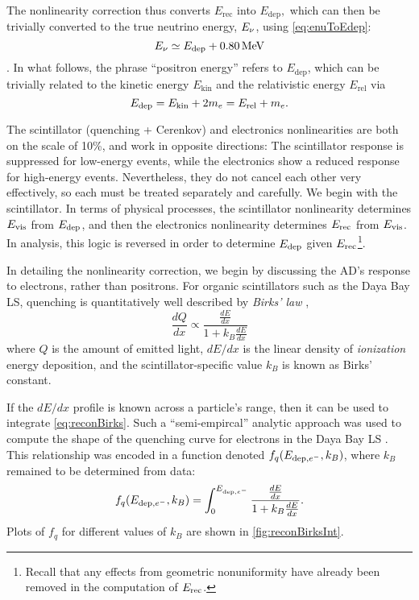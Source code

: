 \documentclass[../thesis.tex]{subfiles}
\begin{document}
The nonlinearity correction thus converts $E_{\mathrm{rec}}$ into $E_{\mathrm{dep}},$ which can then be trivially converted to the true neutrino energy, $E_\mathrm{\nu}$, using \autoref{eq:enuToEdep}:
\begin{equation}
  E_\mathrm{\nu} \simeq E_\mathrm{dep} + \SI{0.80}{MeV} 
\end{equation}.
In what follows, the phrase ``positron energy'' refers to $E_{\mathrm{dep}}$, which can be trivially related to the kinetic energy $E_{\mathrm{kin}}$ and the relativistic energy $E_{\mathrm{rel}}$ via
\begin{equation}
  E_\mathrm{dep} = E_{\mathrm{kin}} + 2m_e = E_{\mathrm{rel}} + m_e.
\end{equation}

The scintillator (quenching + Cerenkov)  and electronics nonlinearities are both on the scale of 10\%, and work in opposite directions: The scintillator response is suppressed for low-energy events, while the electronics show a reduced response for high-energy events. Nevertheless, they do not cancel each other very effectively, so each must be treated separately and carefully. We begin with the scintillator. In terms of physical processes, the scintillator nonlinearity determines $E_\mathrm{vis}$ from $E_\mathrm{dep}$, and then the electronics nonlinearity determines $E_\mathrm{rec}$ from $E_\mathrm{vis}$. In analysis, this logic is reversed in order to determine $E_\mathrm{dep}$ given $E_\mathrm{rec}$\footnote{Recall that any effects from geometric nonuniformity have already been removed in the computation of $E_\mathrm{rec}$.}.

In detailing the nonlinearity correction, we begin by discussing the AD's response to electrons, rather than positrons. For organic scintillators such as the Daya Bay LS, quenching is quantitatively well described by \emph{Birks' law} \cite{Birks_1951},
\begin{equation}
  \frac{dQ}{dx} \propto \frac{\frac{dE}{dx}}{1 + k_B \frac{dE}{dx}}
  \label{eq:reconBirks}
\end{equation}
where $Q$ is the amount of emitted light, $dE/dx$ is the linear density of \emph{ionization} energy deposition, and the scintillator-specific value $k_B$ is known as Birks' constant.

If the $dE/dx$ profile is known across a particle's range, then it can be used to integrate \eqref{eq:reconBirks}. Such a ``semi-empircal'' analytic approach was used to compute the shape of the quenching curve for electrons in the Daya Bay LS \cite{NonlinearityPaper}. This relationship was encoded in a function denoted $f_q(E_{\mathrm{dep},e^-}, k_B)$, where $k_B$ remained to be determined from data:
\begin{equation}
  f_q(E_{\mathrm{dep},e^-},k_B) = \int_0^{E_{\mathrm{dep},e^-}} \frac{\frac{dE}{dx}}{1 + k_B \frac{dE}{dx}}.
  \label{eq:reconBirksInt}
\end{equation}
Plots of $f_q$ for different values of $k_B$ are shown in \autoref{fig:reconBirksInt}.
\end{document}
